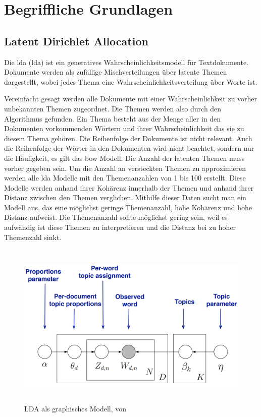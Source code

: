 \chapter{Begriffliche Grundlagen}

\section{Latent Dirichlet Allocation}
Die \acl{lda} (\ac{lda}) ist ein generatives Wahrscheinlichkeitsmodell für Textdokumente. \parencite[vgl.][S. 996]{Blei03latentdirichlet} Dokumente werden als zufällige Mischverteilungen über latente Themen dargestellt, wobei jedes Thema eine Wahrscheinlichkeitsverteilung über Worte ist. 

Vereinfacht gesagt werden alle Dokumente mit einer Wahrscheinlichkeit zu vorher unbekannten Themen zugeordnet. Die Themen werden also durch den Algorithmus gefunden. Ein Thema besteht aus der Menge aller in den Dokumenten vorkommenden Wörtern und ihrer Wahrscheinlichkeit das sie zu diesem Thema gehören.
Die Reihenfolge der Dokumente ist nicht relevant. Auch die Reihenfolge der Wörter in den Dokumenten wird nicht beachtet, sondern nur die Häufigkeit, es gilt das \acl{bow} Modell. \parencite[vgl.][S. 155-156]{harris1954distributional} Die Anzahl der latenten Themen muss vorher gegeben sein.
Um die Anzahl an versteckten Themen zu approximieren werden alle \ac{lda} Modelle mit den Themenanzahlen von 1 bis 100 erstellt. Diese Modelle werden anhand ihrer Kohärenz innerhalb der Themen und anhand ihrer Distanz zwischen den Themen verglichen. Mithilfe dieser Daten sucht man ein Modell aus, das eine möglichst geringe Themenanzahl, hohe Kohärenz und hohe Distanz aufweist. Die Themenanzahl sollte möglichst gering sein, weil es aufwändig ist diese Themen zu interpretieren und die Distanz bei zu hoher Themenzahl sinkt.

\begin{figure}[htpb]
	\centering
	\includegraphics[width=\textwidth,height=8cm,keepaspectratio=true]{lda.png}
	\caption{
		LDA als graphisches Modell, von \parencite[vgl.][S. 23]{ProbabilisticTopicModels}
	}
	\label{fig:LDA Modell}
\end{figure}


